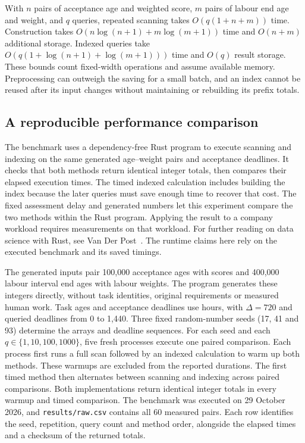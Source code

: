 With $n$ pairs of acceptance age and weighted score, $m$ pairs of labour end age and weight, and $q$ queries, repeated scanning takes $O(q(1+n+m))$ time. Construction takes $O(n\log(n+1)+m\log(m+1))$ time and $O(n+m)$ additional storage. Indexed queries take $O(q(1+\log(n+1)+\log(m+1)))$ time and $O(q)$ result storage. These bounds count fixed-width operations and assume available memory. Preprocessing can outweigh the saving for a small batch, and an index cannot be reused after its input changes without maintaining or rebuilding its prefix totals.

\subsection{A reproducible performance comparison}

The benchmark uses a dependency-free Rust program to execute scanning and indexing on the same generated age--weight pairs and acceptance deadlines. It checks that both methods return identical integer totals, then compares their elapsed execution times. The timed indexed calculation includes building the index because the later queries must save enough time to recover that cost. The fixed assessment delay and generated numbers let this experiment compare the two methods within the Rust program. Applying the result to a company workload requires measurements on that workload. For further reading on data science with Rust, see Van Der Post~\cite{vanderpost2024datascience}. The runtime claims here rely on the executed benchmark and its saved timings.

The generated inputs pair 100,000 acceptance ages with scores and 400,000 labour interval end ages with labour weights. The program generates these integers directly, without task identities, original requirements or measured human work. Task ages and acceptance deadlines use hours, with $\Delta=720$ and queried deadlines from 0 to 1,440. Three fixed random-number seeds (17, 41 and 93) determine the arrays and deadline sequences. For each seed and each $q\in\{1,10,100,1000\}$, five fresh processes execute one paired comparison. Each process first runs a full scan followed by an indexed calculation to warm up both methods. These warmups are excluded from the reported durations. The first timed method then alternates between scanning and indexing across paired comparisons. Both implementations return identical integer totals in every warmup and timed comparison. The benchmark was executed on 29 October 2026, and \texttt{results/raw.csv} contains all 60 measured pairs. Each row identifies the seed, repetition, query count and method order, alongside the elapsed times and a checksum of the returned totals.

